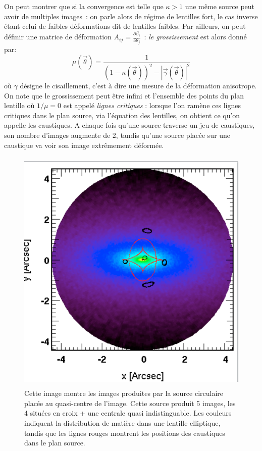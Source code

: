 On peut montrer que si la convergence est telle que $\kappa >1$ une même source peut avoir de multiples images~: on parle alors de régime de lentilles fort, le cas inverse étant celui de faibles déformations dit de lentilles faibles. Par ailleurs, on peut définir une matrice de déformation $A_{ij}=\frac{\partial \beta_i}{\partial \theta_j}$~: \textit{le grossissement} est alors donné par:
\begin{equation}
\mu(\vec{\theta})=\frac{1}{(1-\kappa(\vec{\theta}))^2 - |\vec{\gamma}(\vec{\theta})|^2}
\end{equation} 
où $\gamma$ désigne le cisaillement, c'est à dire une mesure de la déformation anisotrope. On note que le grossissement peut être infini et l'ensemble des points du plan lentille où $1/\mu=0$ est appelé \textit{lignes critiques} : lorsque l'on ramène ces lignes critiques dans le plan source, via l'équation des lentilles, on obtient ce qu'on appelle les caustiques. A chaque fois qu'une source traverse un jeu de caustiques, son nombre d'images augmente de 2, tandis qu'une source placée sur une caustique va voir son image extrêmement déformée.

\begin{figure}[htbp]
	\centering
		\includegraphics[height=12cm]{figs/SPL.png}
	\caption[Exemple de calcul de lentilles gravitationnelles]{Cette image montre les images produites par la source circulaire placée au quasi-centre de l'image. Cette source produit 5 images, les 4 situées en croix + une centrale quasi indistinguable. Les couleurs indiquent la distribution de matière dans une lentille elliptique, tandis que les lignes rouges montrent les positions des caustiques dans le plan source.} 
	\label{f:SPL}
\end{figure}


